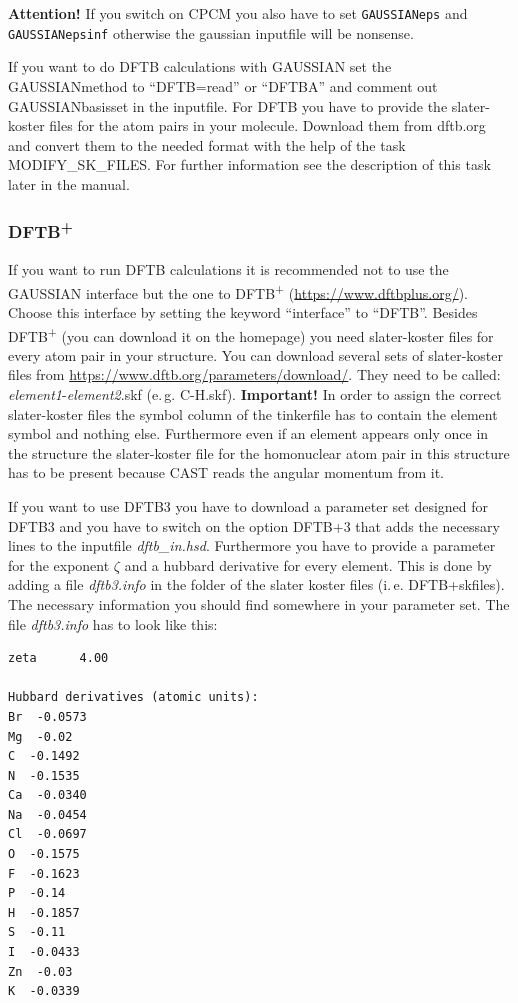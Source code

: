 \documentclass[10pt,a4paper]{article} %
\begin{document}
\textbf{Attention!} If you switch on CPCM you also have to set \texttt{GAUSSIANeps} and \texttt{GAUSSIANepsinf} otherwise the gaussian inputfile will be nonsense.

If you want to do DFTB calculations with GAUSSIAN set the GAUSSIANmethod to ``DFTB=read'' or ``DFTBA'' and comment out GAUSSIANbasisset in the inputfile. For DFTB you have to provide the slater-koster files for the atom pairs in your molecule. Download them from dftb.org and convert them to the needed format with the help of the task MODIFY\_SK\_FILES. For further information see the description of this task later in the manual.

\subsubsection{DFTB\textsuperscript{+}}

If you want to run DFTB calculations it is recommended not to use the GAUSSIAN interface but the one to DFTB\textsuperscript{+} (\url{https://www.dftbplus.org/}). Choose this interface by setting the keyword ``interface'' to ``DFTB''. Besides DFTB\textsuperscript{+} (you can download it on the homepage) you need slater-koster files for every atom pair in your structure. You can download several sets of slater-koster files from \url{https://www.dftb.org/parameters/download/}. They need to be called: \textit{element1}-\textit{element2}.skf (e.\,g. C-H.skf). \textbf{Important!} In order to assign the correct slater-koster files the symbol column of the tinkerfile has to contain the element symbol and nothing else. Furthermore even if an element appears only once in the structure the slater-koster file for the homonuclear atom pair in this structure has to be present because \ac{CAST} reads the angular momentum from it.

If you want to use DFTB3 you have to download a parameter set designed for DFTB3 and you have to switch on the option DFTB+3 that adds the necessary lines to the inputfile \textit{dftb\_in.hsd}. Furthermore you have to provide a parameter for the exponent $\zeta$ and a hubbard derivative for every element. This is done by adding a file \textit{dftb3.info} in the folder of the slater koster files (i.\,e. DFTB+skfiles). The necessary information you should find somewhere in your parameter set. The file \textit{dftb3.info} has to look like this:

\begin{lstlisting}
zeta	  4.00	

Hubbard derivatives (atomic units):
Br  -0.0573	
Mg  -0.02
C  -0.1492	
N  -0.1535
Ca  -0.0340	
Na  -0.0454
Cl  -0.0697	
O  -0.1575
F  -0.1623	
P  -0.14
H  -0.1857	
S  -0.11
I  -0.0433	
Zn  -0.03
K  -0.0339		
\end{lstlisting}
\end{document}

